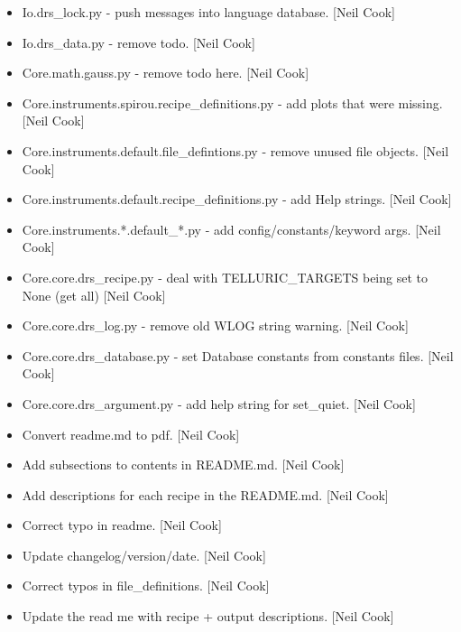 \documentclass[a4paper,10pt,english]{report}
\begin{document}
\begin{itemize}
\item {} 
Io.drs\_lock.py - push messages into language database. {[}Neil Cook{]}

\item {} 
Io.drs\_data.py - remove todo. {[}Neil Cook{]}

\item {} 
Core.math.gauss.py - remove todo here. {[}Neil Cook{]}

\item {} 
Core.instruments.spirou.recipe\_definitions.py - add plots that were
missing. {[}Neil Cook{]}

\item {} 
Core.instruments.default.file\_defintions.py - remove unused file
objects. {[}Neil Cook{]}

\item {} 
Core.instruments.default.recipe\_definitions.py - add Help strings.
{[}Neil Cook{]}

\item {} 
Core.instruments.*.default\_*.py - add config/constants/keyword args.
{[}Neil Cook{]}

\item {} 
Core.core.drs\_recipe.py - deal with TELLURIC\_TARGETS being set to None
(get all) {[}Neil Cook{]}

\item {} 
Core.core.drs\_log.py - remove old WLOG string warning. {[}Neil Cook{]}

\item {} 
Core.core.drs\_database.py - set Database constants from constants
files. {[}Neil Cook{]}

\item {} 
Core.core.drs\_argument.py - add help string for set\_quiet. {[}Neil Cook{]}

\item {} 
Convert readme.md to pdf. {[}Neil Cook{]}

\item {} 
Add subsections to contents in README.md. {[}Neil Cook{]}

\item {} 
Add descriptions for each recipe in the README.md. {[}Neil Cook{]}

\item {} 
Correct typo in readme. {[}Neil Cook{]}

\item {} 
Update changelog/version/date. {[}Neil Cook{]}

\item {} 
Correct typos in file\_definitions. {[}Neil Cook{]}

\item {} 
Update the read me with recipe + output descriptions. {[}Neil Cook{]}

\end{itemize}
\end{document}

